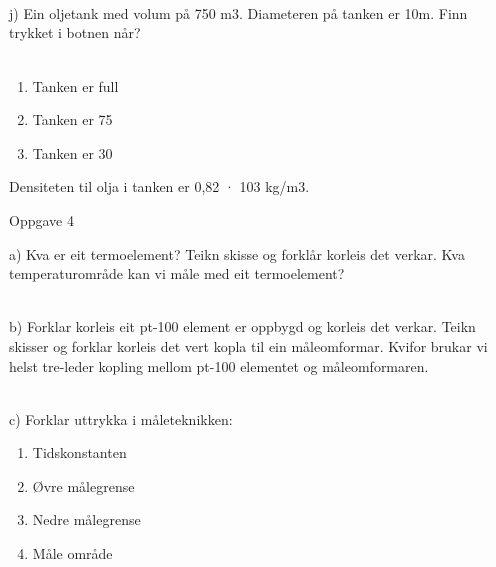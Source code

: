 \\\\
\\
j) Ein oljetank med volum på 750 m3. Diameteren på tanken er 10m. Finn trykket i botnen når? 
\\\\
\begin{enumerate}


 \item Tanken er full
 \item Tanken er 75%
 \item Tanken er 30%

\end{enumerate}

Densiteten til olja i tanken er 0,82 · 103 kg/m3.
	 \\
Oppgave 4

a) Kva er eit termoelement? Teikn skisse og forklår korleis det verkar. Kva temperaturområde kan vi måle med eit termoelement?
\\
\\
\eject
b) Forklar korleis eit pt-100 element er oppbygd og korleis det verkar. Teikn skisser og forklar korleis det vert kopla til ein måleomformar. Kvifor brukar vi helst tre-leder kopling mellom pt-100 elementet og måleomformaren.
\\
\\
c) Forklar uttrykka i måleteknikken: 
\begin{enumerate}
\item Tidskonstanten
\item Øvre målegrense
\item Nedre målegrense
\item Måle område
\end{enumerate}

\\

